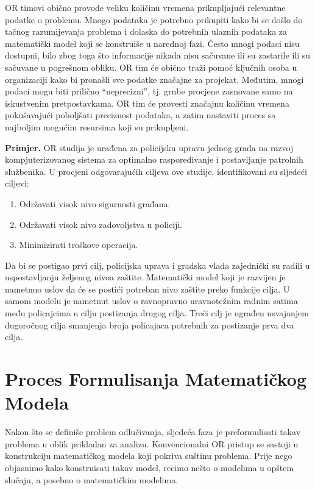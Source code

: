 \documentclass[a4paper, utf8, 11pt, colorlinks]{book}
\begin{document}
 OR timovi obično provode veliku količinu vremena prikupljajući relevantne podatke o problemu. Mnogo podataka je potrebno prikupiti kako bi se došlo do tačnog razumijevanja problema i dolaska do potrebnih ulaznih podataka za matematički model koji se konstruiše u narednoj fazi.  Često mnogi    podaci nisu dostupni, bilo zbog toga što informacije nikada nisu sačuvane ili su zastarile ili su sačuvane u pogrešnom obliku.   OR tim će obično   traži pomoć ključnih osoba u organizaciji kako bi pronašli sve podatke značajne za projekat. Međutim, mnogi podaci mogu biti prilično ``neprecizni'', tj. grube procjene zasnovane samo na iskustvenim pretpostavkama. OR tim će provesti značajnu količinu vremena pokušavajući poboljšati
preciznost podataka, a zatim nastaviti proces sa najboljim mogućim resursima koji su prikupljeni. 

\textbf{Primjer.}  OR studija je urađena za policijsku upravu jednog grada %
na razvoj kompjuterizovanog sistema za optimalno raspoređivanje i postavljanje patrolnih službenika. U procjeni odgovarajućih ciljeva ove studije, identifikovani su sljedeći ciljevi:
\begin{enumerate}
    \item  Održavati visok nivo sigurnosti građana.
    \item  Održavati visok nivo zadovoljstva u policiji.
     \item Minimizirati troškove operacija.
\end{enumerate}
Da bi se postigao prvi cilj, policijska uprava i gradska vlada zajednički su radili u uspostavljanju željenog nivoa zaštite.  Matematički model koji je razvijen je nametnuo uslov da će se postići potreban nivo zaštite preko funkcije cilja. U samom modelu je nametnut uslov o ravnopravno uravnotežnim radnim satima među policajcima u cilju postizanja drugog cilja. Treći cilj je ugrađen usvajanjem dugoročnog cilja smanjenja broja policajaca potrebnih za postizanje prva dva cilja. 

\section{Proces Formulisanja Matematičkog Modela}

Nakon što se definiše problem odlučivanja, sljedeća faza je preformulisati takav problema u oblik prikladan za analizu. Konvencionalni OR pristup se sastoji u konstrukciju matematičkog modela koji pokriva suštinu problema. Prije nego objasnimo kako konstruisati takav model, recimo nešto o modelima u opštem slučaju, a posebno o matematičkim modelima.
\end{document}
